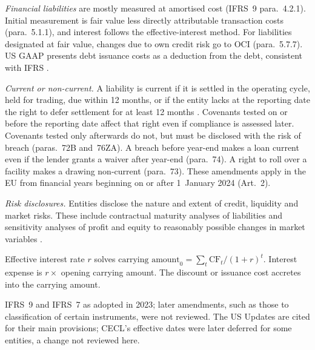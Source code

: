 \begin{qfmethod}
\emph{Financial liabilities} are mostly measured at amortised cost (IFRS~9 para.~4.2.1). Initial measurement is fair value less directly attributable transaction costs (para.~5.1.1), and interest follows the effective-interest method. For liabilities designated at fair value, changes due to own credit risk go to OCI (para.~5.7.7). US GAAP presents debt issuance costs as a deduction from the debt, consistent with IFRS \citep[p.~1]{us-debt-issuance-costs-2015}.

\emph{Current or non-current.} A liability is current if it is settled in the operating cycle, held for trading, due within 12 months, or if the entity lacks at the reporting date the right to defer settlement for at least 12 months \citep[Annex, IAS~1 para.~69]{eu-2023-2822-ias1}. Covenants tested on or before the reporting date affect that right even if compliance is assessed later. Covenants tested only afterwards do not, but must be disclosed with the risk of breach (paras.~72B and~76ZA). A breach before year-end makes a loan current even if the lender grants a waiver after year-end (para.~74). A right to roll over a facility makes a drawing non-current (para.~73). These amendments apply in the EU from financial years beginning on or after 1~January 2024 (Art.~2).

\emph{Risk disclosures.} Entities disclose the nature and extent of credit, liquidity and market risks. These include contractual maturity analyses of liabilities and sensitivity analyses of profit and equity to reasonably possible changes in market variables \citep[IFRS~7 paras.~31--34, 39--40]{eu-2023-1803-ifrs7}.

 Effective interest rate $r$ solves $\text{carrying amount}_0=\sum_t \text{CF}_t/(1+r)^t$. Interest expense is $r\times$ opening carrying amount. The discount or issuance cost accretes into the carrying amount.

 IFRS~9 and IFRS~7 as adopted in 2023; later amendments, such as those to classification of certain instruments, were not reviewed. The US Updates are cited for their main provisions; CECL's effective dates were later deferred for some entities, a change not reviewed here.


\end{qfmethod}
